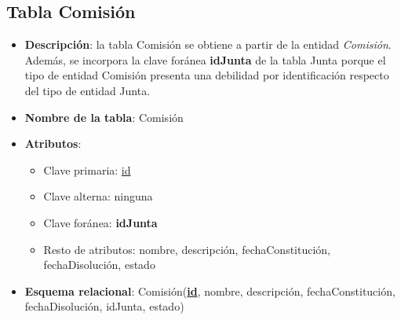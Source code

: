 \subsection{Tabla Comisión}
    \begin{itemize}
        \item \textbf{Descripción}: la tabla Comisión se obtiene a partir de la entidad \textit{Comisión}. Además, se incorpora la clave foránea \textbf{idJunta} de la tabla Junta porque el tipo de entidad Comisión presenta una debilidad por identificación respecto del tipo de entidad Junta.
        \item \textbf{Nombre de la tabla}: Comisión
        \item \textbf{Atributos}:
            \begin{itemize}
                \item Clave primaria: \underline{id}
                \item Clave alterna: ninguna
                \item Clave foránea: \textbf{idJunta}
                \item Resto de atributos: nombre, descripción, fechaConstitución, fechaDisolución, estado
            \end{itemize}
        \item \textbf{Esquema relacional}: 
            Comisión(\textbf{\underline{id}}, nombre, descripción, fechaConstitución, fechaDisolución, idJunta, estado)
    \end{itemize}


